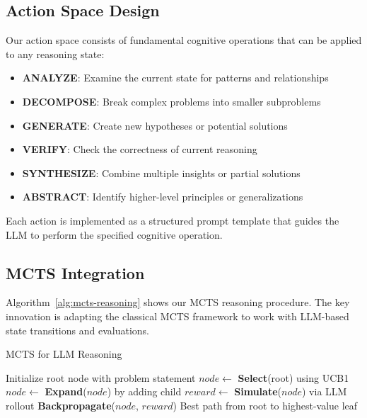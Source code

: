 \documentclass[conference]{IEEEtran}
\begin{document}
\subsection{Action Space Design}

Our action space consists of fundamental cognitive operations that can be applied to any reasoning state:

\begin{itemize}
\item \textbf{ANALYZE}: Examine the current state for patterns and relationships
\item \textbf{DECOMPOSE}: Break complex problems into smaller subproblems  
\item \textbf{GENERATE}: Create new hypotheses or potential solutions
\item \textbf{VERIFY}: Check the correctness of current reasoning
\item \textbf{SYNTHESIZE}: Combine multiple insights or partial solutions
\item \textbf{ABSTRACT}: Identify higher-level principles or generalizations
\end{itemize}

Each action is implemented as a structured prompt template that guides the LLM to perform the specified cognitive operation.

\subsection{MCTS Integration}

Algorithm~\ref{alg:mcts-reasoning} shows our MCTS reasoning procedure. The key innovation is adapting the classical MCTS framework to work with LLM-based state transitions and evaluations.

\begin{algorithm}[htb]
\caption{MCTS for LLM Reasoning}
\label{alg:mcts-reasoning}
\begin{algorithmic}[1]
\STATE Initialize root node with problem statement
    \STATE $node \leftarrow$ \textbf{Select}(root) using UCB1
        \STATE $node \leftarrow$ \textbf{Expand}($node$) by adding child
    \ENDIF
    \STATE $reward \leftarrow$ \textbf{Simulate}($node$) via LLM rollout
    \STATE \textbf{Backpropagate}($node$, $reward$)
\ENDFOR
\RETURN Best path from root to highest-value leaf
\end{algorithmic}
\end{algorithm}
\end{document}

